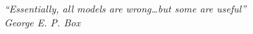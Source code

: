 \thispagestyle{empty}
\hbox{} \vfill
\begin{flushright}
\small \textit{``Essentially, all models are wrong\ldots  but some are useful''}
\\ \vspace{2mm}  
\scriptsize \emph{George E. P. Box}
\end{flushright}

\clearpage
\thispagestyle{empty}
\cleardoublepage